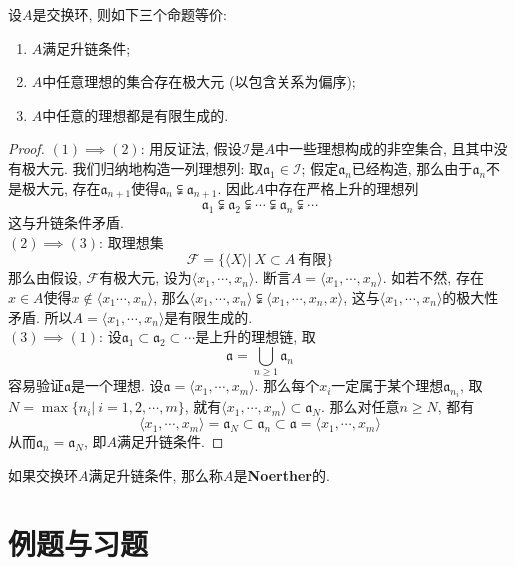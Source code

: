 \begin{prop}
    设$A$是交换环, 则如下三个命题等价:
    \begin{enumerate}[\rm (1)]
        \item $A$满足升链条件;
        \item $A$中任意理想的集合存在极大元 (以包含关系为偏序);
        \item $A$中任意的理想都是有限生成的.
    \end{enumerate}
\end{prop}
\begin{proof}
    $(1)\implies (2)$: 用反证法, 假设$\mathscr{I}$是$A$中一些理想构成的非空集合, 且其中没有极大元.
    我们归纳地构造一列理想列: 取$\mathfrak{a}_1\in\mathscr{I}$; 假定$\mathfrak{a}_n$已经构造, 那么由于$\mathfrak{a}_n$不是极大元, 存在$\mathfrak{a}_{n+1}$使得$\mathfrak{a}_n\subsetneqq\mathfrak{a}_{n+1}$.
    因此$A$中存在严格上升的理想列
    \[\mathfrak{a}_1\subsetneqq\mathfrak{a}_2\subsetneqq\cdots\subsetneqq\mathfrak{a}_n\subsetneqq\cdots\]
    这与升链条件矛盾.\\
    $(2)\implies (3)$: 取理想集
    \[\mathscr{F}=\{\langle X\rangle|\ X\subset A\ \text{有限}\}\]
    那么由假设, $\mathscr{F}$有极大元, 设为$\langle x_1,\cdots,x_n\rangle$.
    断言$A=\langle x_1,\cdots,x_n\rangle$.
    如若不然, 存在$x\in A$使得$x\notin\langle x_1\cdots,x_n\rangle$, 那么$\langle x_1,\cdots,x_n\rangle\subsetneqq\langle x_1,\cdots,x_n,x\rangle$, 这与$\langle x_1,\cdots,x_n\rangle$的极大性矛盾.
    所以$A=\langle x_1,\cdots,x_n\rangle$是有限生成的.\\
    $(3)\implies (1)$: 设$\mathfrak{a}_1\subset\mathfrak{a}_2\subset\cdots$是上升的理想链, 取
    \[\mathfrak{a}=\bigcup_{n\geq 1}\mathfrak{a}_n\]
    容易验证$\mathfrak{a}$是一个理想.
    设$\mathfrak{a}=\langle x_1,\cdots,x_m\rangle$.
    那么每个$x_i$一定属于某个理想$\mathfrak{a}_{n_i}$, 取$N=\max\{n_i|\ i=1,2,\cdots,m\}$, 就有$\langle x_1,\cdots,x_m\rangle\subset\mathfrak{a}_N$.
    那么对任意$n\geq N$, 都有
    \[\langle x_1,\cdots,x_m\rangle=\mathfrak{a}_N\subset\mathfrak{a}_n\subset\mathfrak{a}=\langle x_1,\cdots,x_m\rangle\]
    从而$\mathfrak{a}_n=\mathfrak{a}_N$, 即$A$满足升链条件.
\end{proof}

\begin{defn}
    如果交换环$A$满足升链条件, 那么称$A$是\textbf{Noerther}的.
\end{defn}

\section{例题与习题}

